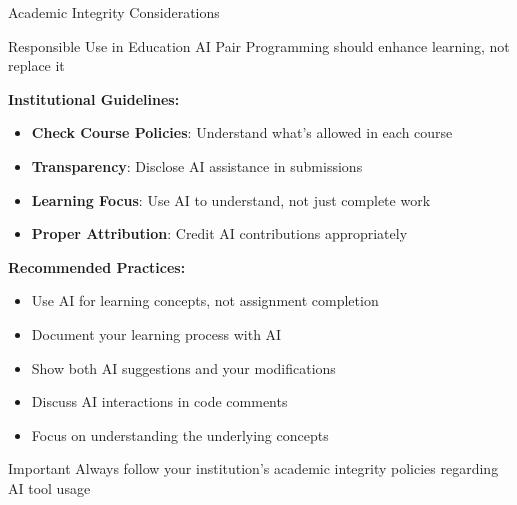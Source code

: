 \documentclass{beamer}
\begin{document}
\begin{frame}[t]{Academic Integrity Considerations}
    \begin{block}{Responsible Use in Education}
        AI Pair Programming should enhance learning, not replace it
    \end{block}
    
    \textbf{Institutional Guidelines:}
    \begin{itemize}
        \item \textbf{Check Course Policies}: Understand what's allowed in each course
        \item \textbf{Transparency}: Disclose AI assistance in submissions
        \item \textbf{Learning Focus}: Use AI to understand, not just complete work
        \item \textbf{Proper Attribution}: Credit AI contributions appropriately
    \end{itemize}
    
    \textbf{Recommended Practices:}
    \begin{itemize}
        \item Use AI for learning concepts, not assignment completion
        \item Document your learning process with AI
        \item Show both AI suggestions and your modifications
        \item Discuss AI interactions in code comments
        \item Focus on understanding the underlying concepts
    \end{itemize}
    
    \begin{alertblock}{Important}
        Always follow your institution's academic integrity policies regarding AI tool usage
    \end{alertblock}
\end{frame}
\end{document}
